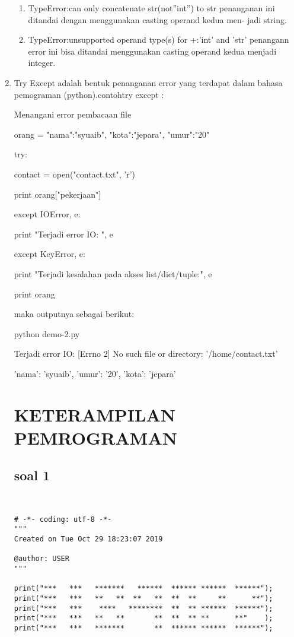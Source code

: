 \begin{enumerate}
\begin{enumerate}
        \item TypeError:can only concatenate  str(not”int”) to str
            penanganan  ini ditandai  dengan menggunakan casting operand kedua men- jadi string.
        \item TypeError:unsupported operand  type(s) for +:’int’  and ’str’
        penangann  error  ini bisa  ditandai   menggunakan  casting  operand  kedua menjadi integer.
    \end{enumerate}
    \item Try  Except  adalah  bentuk  penanganan  error yang terdapat dalam  bahasa  pemograman  (python).contohtry except :
    \par Menangani error pembacaan file
    \par orang = {"nama":"syuaib", "kota":"jepara", "umur":"20"}

    \par    try:
         \par contact = open("contact.txt", 'r')
        \par print orang["pekerjaan"]
         \par except IOError, e:
         \par print "Terjadi error IO: ", e
        \par except KeyError, e:
         \par print "Terjadi kesalahan pada akses list/dict/tuple:", e
         \par print orang
    \par maka outputnya sebagai berikut:
    \par python demo-2.py 
       \par  Terjadi error IO:  [Errno 2] No such file or directory: '/home/contact.txt'
        \par {{'nama': 'syuaib', 'umur': '20', 'kota': 'jepara'}}
        
\chapter{KETERAMPILAN PEMROGRAMAN}
\section*{soal 1}\\
\begin{lstlisting}
# -*- coding: utf-8 -*-
"""
Created on Tue Oct 29 18:23:07 2019

@author: USER
"""

print("***   ***   *******   ******  ****** ******  ******");
print("***   ***   **   **  **   **  **  **     **      **");
print("***   ***    ****   ********  **  ** ******  ******");
print("***   ***   **   **       **  **  ** **      **"    );
print("***   ***   *******       **  ****** ******  ******");
\end{lstlisting}

\end{enumerate}

